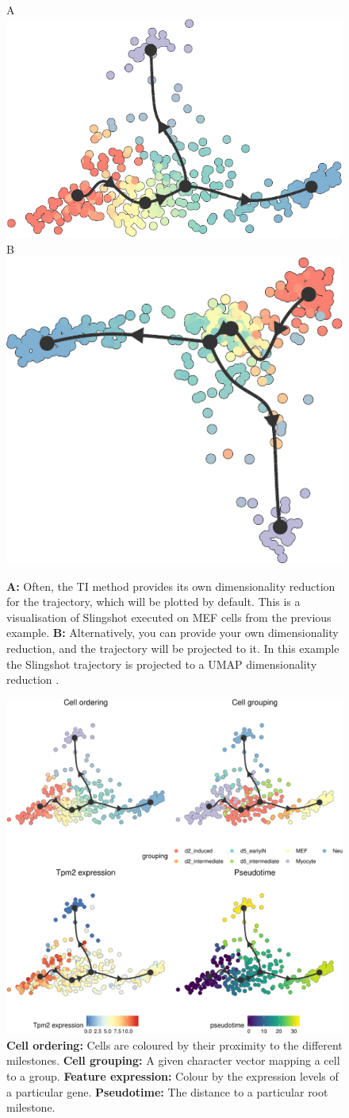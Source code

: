 \begin{figure}[ht!]
  \centering
  A
  \includegraphics[width=.4\linewidth,valign=t]{manuscript_files/figure-latex/plotslingshot-1.pdf}
  B
  \includegraphics[width=.4\linewidth,valign=t]{manuscript_files/figure-latex/plotslingshot_umap-1.pdf}
  \caption{
  	\textbf{A:} Often, the TI method provides its own dimensionality reduction for the trajectory, which will be plotted by default. This is a visualisation of Slingshot \cite{street_slingshotcelllineage_2018} executed on MEF cells from the previous example.
  	\textbf{B:} Alternatively, you can provide your own dimensionality reduction, and the trajectory will be projected to it. In this example the Slingshot trajectory is projected to a UMAP dimensionality reduction \cite{mcinnes_umapuniformmanifold_2018}.
	}
\label{fig:dimred}
\end{figure}

\begin{figure}[ht!]
	\centering
	\includegraphics[width=.6\linewidth]{manuscript_files/figure-latex/slingshot_multi-1.pdf}
  \caption{
		\textbf{Cell ordering:} Cells are coloured by their proximity to the different milestones.
		\textbf{Cell grouping:} A given character vector mapping a cell to a group.
		\textbf{Feature expression:} Colour by the expression levels of a particular gene.
		\textbf{Pseudotime:} The distance to a particular root milestone.
	}
	\label{fig:colorby}
\end{figure}


